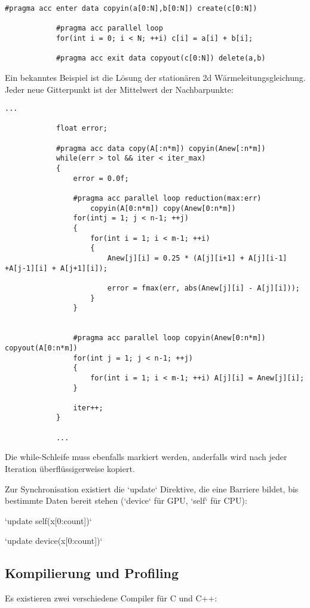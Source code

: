 			\begin{lstlisting}[caption=OpenACC: Speicherverwaltung]
			#pragma acc enter data copyin(a[0:N],b[0:N]) create(c[0:N])
			
			#pragma acc parallel loop
			for(int i = 0; i < N; ++i) c[i] = a[i] + b[i];
			
			#pragma acc exit data copyout(c[0:N]) delete(a,b)
			\end{lstlisting}
			
			Ein bekanntes Beispiel ist die Lösung der stationären 2d Wärmeleitungsgleichung. Jeder neue Gitterpunkt ist der Mittelwert der Nachbarpunkte:
			
			\begin{lstlisting}[caption=OpenACC: Wärmeleitungsgleichung]
			...
			
			float error;
			
			#pragma acc data copy(A[:n*m]) copyin(Anew[:n*m]) 
			while(err > tol && iter < iter_max) 
			{
				error = 0.0f;
				
				#pragma acc parallel loop reduction(max:err)
					copyin(A[0:n*m]) copy(Anew[0:n*m])
				for(intj = 1; j < n-1; ++j) 
				{
					for(int i = 1; i < m-1; ++i) 
					{
						Anew[j][i] = 0.25 * (A[j][i+1] + A[j][i-1] +A[j-1][i] + A[j+1][i]);
						
						error = fmax(err, abs(Anew[j][i] - A[j][i]));
					}
				}
				
		
				#pragma acc parallel loop copyin(Anew[0:n*m]) copyout(A[0:n*m])
				for(int j = 1; j < n-1; ++j) 
				{
					for(int i = 1; i < m-1; ++i) A[j][i] = Anew[j][i];
				}
				
				iter++;
			}
			
			...
			\end{lstlisting}
			
			Die while-Schleife muss ebenfalls markiert werden, anderfalls wird nach jeder Iteration überflüssigerweise kopiert.
			
			Zur Synchronisation existiert die \li`update` Direktive, die eine Barriere bildet, bis bestimmte Daten bereit stehen (\li`device` für GPU, \li`self` für CPU):
			
			\begin{center} 
			\li`update self(x[0:count])`
			
			\li`update device(x[0:count])`
			\end{center}
			
			\subsection{Kompilierung und Profiling}\label{komp}
			Es existieren zwei verschiedene Compiler für C und C++:
			
